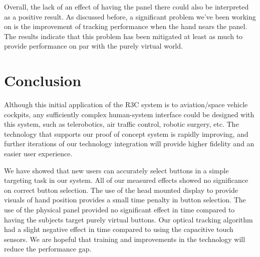Overall, the lack of an effect of having the panel there could also be interpreted as a positive result.
As discussed before, a significant problem we've been working on is the improvement of tracking performance when the hand nears the panel.
The results indicate that this problem has been mitigated at least as much to provide performance on par with the purely virtual world.

\section{Conclusion}

Although this initial application of the R3C system is to aviation/space vehicle cockpits, any sufficiently complex human-system interface could be designed with this system, such as telerobotics, air traffic control, robotic surgery, etc.
The technology that supports our proof of concept system is rapidly improving, and further iterations of our technology integration will provide higher fidelity and an easier user experience.


We have showed that new users can accurately select buttons in a simple targeting task in our system.
All of our measured effects showed no significance on correct button selection.
The use of the head mounted display to provide visuals of hand position provides a small time penalty in button selection.
The use of the physical panel provided no significant effect in time compared to having the subjects target purely virtual buttons.
Our optical tracking algorithm had a slight negative effect in time compared to using the capacitive touch sensors.
We are hopeful that training and improvements in the technology will reduce the performance gap.
